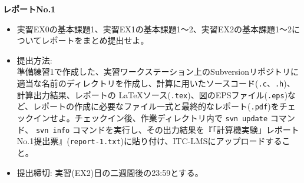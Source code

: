 \documentclass[11pt]{jarticle}
\begin{document}
\noindent
{\bf\large レポートNo.1}
\noindent
\begin{itemize}
\item 実習EX0の基本課題1、実習EX1の基本課題1〜2、実習EX2の基本課題1〜2についてレポートをまとめ提出せよ。
\item 提出方法: \\
  準備練習1で作成した、実習ワークステーション上のSubversionリポジトリに適当な名前のディレクトリを作成し、計算に用いたソースコード({\tt *.c}、{\tt *.h})、計算出力結果、レポートの \LaTeX ソース({\tt *.tex})、図のEPSファイル({\tt *.eps})など、レポートの作成に必要なファイル一式と最終的なレポート({\tt *.pdf})をチェックインせよ。チェックイン後、作業ディレクトリ内で {\tt svn update} コマンド、 {\tt svn info} コマンドを実行し、その出力結果を『「計算機実験」レポートNo.1提出票』({\tt report-1.txt})に貼り付け、ITC-LMSにアップロードすること。
\item 提出締切: 実習(EX2)日の二週間後の23:59とする。
\end{itemize}
\end{document}
